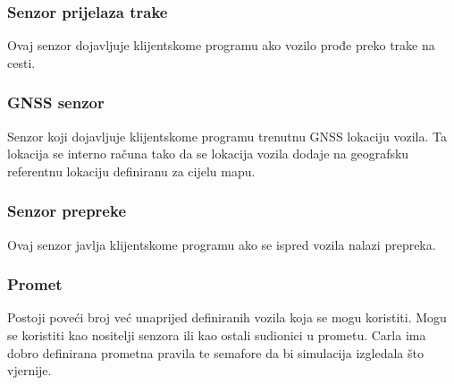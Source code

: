 \subsubsection{Senzor prijelaza trake}
Ovaj senzor dojavljuje klijentskome programu ako vozilo prođe preko trake na cesti.

\subsubsection{GNSS senzor}
Senzor koji dojavljuje klijentskome programu trenutnu GNSS lokaciju vozila. Ta lokacija se interno računa tako da se lokacija vozila dodaje na geografsku referentnu lokaciju definiranu za cijelu mapu.

\subsubsection{Senzor prepreke}
Ovaj senzor javlja klijentskome programu ako se ispred vozila nalazi prepreka.

\subsubsection{Promet}
Postoji poveći broj već unaprijed definiranih vozila koja se mogu koristiti. Mogu se koristiti kao nositelji senzora ili kao ostali sudionici u prometu. Carla ima dobro definirana prometna pravila te semafore da bi simulacija izgledala što vjernije.
\newpage